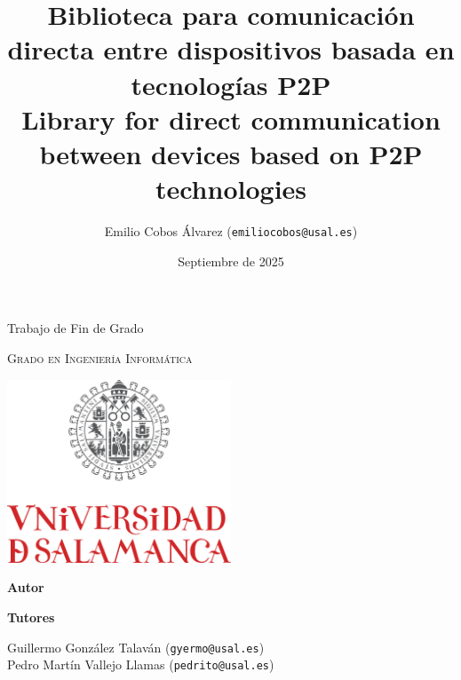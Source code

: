 \documentclass[12pt,a4paper]{report}
\title{
  \textbf{Biblioteca para comunicación directa entre dispositivos basada en tecnologías P2P} \\
  \vspace{\parskip}
  \small Library for direct communication between devices based on P2P technologies
}
\author{
  Emilio Cobos Álvarez (\texttt{emiliocobos@usal.es})
}
\date{Septiembre de 2025}
\begin{document}
 


\begin{titlepage}
\begin{center}
  {\Large \thetitle}

  \vspace*{\fill}

  {\large Trabajo de Fin de Grado}

  \textsc{Grado en Ingeniería Informática}

  \vspace{2em}

  \includegraphics[width=0.5\textwidth]{res/usal-logo.pdf}

  \vspace{2em}

  \thedate

  \vspace*{\fill}

  {\large \textbf{Autor}}

  \theauthor

  \vspace{\parskip}

  {\large \textbf{Tutores}}

  Guillermo González Talaván (\texttt{gyermo@usal.es}) \\ Pedro Martín Vallejo Llamas (\texttt{pedrito@usal.es})
\end{center}
\end{titlepage}



\clearpage



\clearpage

\printglossaries

\clearpage
\end{document}

